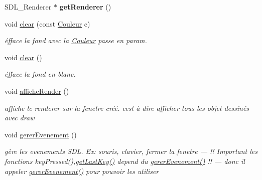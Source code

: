 \begin{DoxyCompactItemize}
\mbox{\label{class_fenetre_abf9778019ebfeba6f45315ffe520598e}} 
S\+D\+L\+\_\+\+Renderer $\ast$ {\bfseries get\+Renderer} ()
\item 
\mbox{\label{class_fenetre_a504a0a670f9c18037a9eee234d89a4c1}} 
void \mbox{\hyperlink{class_fenetre_a504a0a670f9c18037a9eee234d89a4c1}{clear}} (const \mbox{\hyperlink{class_couleur}{Couleur}} c)
\begin{DoxyCompactList}\small\item\em éfface la fond avec la \mbox{\hyperlink{class_couleur}{Couleur}} passe en param. \end{DoxyCompactList}\item 
\mbox{\label{class_fenetre_a193e7e6feddcbf05873467fa3dfc815c}} 
void \mbox{\hyperlink{class_fenetre_a193e7e6feddcbf05873467fa3dfc815c}{clear}} ()
\begin{DoxyCompactList}\small\item\em éfface la fond en blanc. \end{DoxyCompactList}\item 
\mbox{\label{class_fenetre_a662dca6b140ef7effb43b8ee2269ff6b}} 
void \mbox{\hyperlink{class_fenetre_a662dca6b140ef7effb43b8ee2269ff6b}{affiche\+Render}} ()
\begin{DoxyCompactList}\small\item\em affiche le renderer sur la fenetre créé. c\textquotesingle{}est à dire afficher tous les objet dessinés avec draw \end{DoxyCompactList}\item 
\mbox{\label{class_fenetre_a07f1ccdcb15d92d007c2b487cb1b29d0}} 
void \mbox{\hyperlink{class_fenetre_a07f1ccdcb15d92d007c2b487cb1b29d0}{gerer\+Evenement}} ()
\begin{DoxyCompactList}\small\item\em gère les evenements S\+DL. Ex\+: souris, clavier, fermer la fenetre --- !! Important les fonctions key\+Pressed(),\mbox{\hyperlink{class_fenetre_a201b7541c17b4915db1d4b6701b0d947}{get\+Last\+Key()}} depend du \mbox{\hyperlink{class_fenetre_a07f1ccdcb15d92d007c2b487cb1b29d0}{gerer\+Evenement()}} !! --- donc il appeler \mbox{\hyperlink{class_fenetre_a07f1ccdcb15d92d007c2b487cb1b29d0}{gerer\+Evenement()}} pour pouvoir les utiliser \end{DoxyCompactList}\item 

\end{DoxyCompactItemize}
